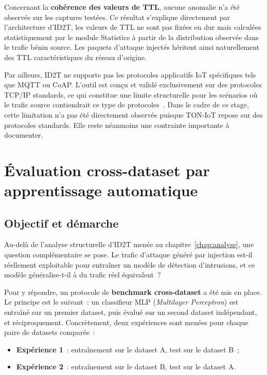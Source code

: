 \documentclass[12pt, a4paper]{report}
\begin{document}
Concernant la \textbf{cohérence des valeurs de TTL}, aucune anomalie
n'a été observée sur les captures testées. Ce résultat s'explique
directement par l'architecture d'ID2T, les valeurs de TTL ne sont pas
fixées en dur mais calculées statistiquement par le module Statistics
à partir de la distribution observée dans le trafic bénin source.
Les paquets d'attaque injectés héritent ainsi naturellement des TTL
caractéristiques du réseau d'origine.

Par ailleurs, ID2T ne supporte pas les protocoles applicatifs IoT
spécifiques tels que MQTT ou CoAP. L'outil est conçu et validé
exclusivement sur des protocoles TCP/IP standards, ce qui constitue
une limite structurelle pour les scénarios où le trafic source
contiendrait ce type de protocoles~\cite{id2t2021}. Dans le cadre de
ce stage, cette limitation n'a pas été directement observée puisque
TON-IoT repose sur des protocoles standards. Elle reste néanmoins
une contrainte importante à documenter.




\chapter{Évaluation cross-dataset par apprentissage automatique}
\label{chap:mlp}
 
\section{Objectif et démarche}
 
Au-delà de l'analyse structurelle d'ID2T menée au chapitre~\ref{chap:analyse},
une question complémentaire se pose. Le trafic d'attaque généré par
injection est-il réellement exploitable pour entraîner un modèle de
détection d'intrusions, et ce modèle généralise-t-il à du trafic réel
équivalent~?
 
Pour y répondre, un protocole de \textbf{benchmark cross-dataset} a été mis
en place. Le principe est le suivant~: un classifieur MLP (\textit{Multilayer
Perceptron}) est entraîné sur un premier dataset, puis évalué sur un second
dataset indépendant, et réciproquement. Concrètement, deux expériences sont
menées pour chaque paire de datasets comparée~:
 
\begin{itemize}
    \item \textbf{Expérience 1}~: entraînement sur le dataset A, test sur le dataset B~;
    \item \textbf{Expérience 2}~: entraînement sur le dataset B, test sur le dataset A.
\end{itemize}
 
\end{document}
